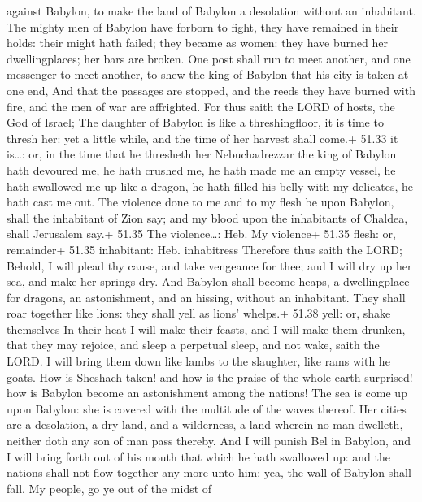 against Babylon, to make the land of Babylon a desolation without an
inhabitant.  The mighty men of Babylon have forborn to
fight, they have remained in their holds: their might hath failed; they
became as women: they have burned her dwellingplaces; her bars are
broken.  One post shall run to meet another, and one
messenger to meet another, to shew the king of Babylon that his city is
taken at one end,  And that the passages are stopped, and
the reeds they have burned with fire, and the men of war are affrighted.
 For thus saith the LORD of hosts, the God of Israel; The
daughter of Babylon is like a threshingfloor, it is time to thresh her:
yet a little while, and the time of her harvest shall come.+ 51.33 it
is\ldots: or, in the time that he thresheth her 
Nebuchadrezzar the king of Babylon hath devoured me, he hath crushed me,
he hath made me an empty vessel, he hath swallowed me up like a dragon,
he hath filled his belly with my delicates, he hath cast me out.
 The violence done to me and to my flesh be upon Babylon,
shall the inhabitant of Zion say; and my blood upon the inhabitants of
Chaldea, shall Jerusalem say.+ 51.35 The violence\ldots: Heb. My
violence+ 51.35 flesh: or, remainder+ 51.35 inhabitant: Heb. inhabitress
 Therefore thus saith the LORD; Behold, I will plead thy
cause, and take vengeance for thee; and I will dry up her sea, and make
her springs dry.  And Babylon shall become heaps, a
dwellingplace for dragons, an astonishment, and an hissing, without an
inhabitant.  They shall roar together like lions: they
shall yell as lions' whelps.+ 51.38 yell: or, shake themselves
 In their heat I will make their feasts, and I will make
them drunken, that they may rejoice, and sleep a perpetual sleep, and
not wake, saith the LORD.  I will bring them down like
lambs to the slaughter, like rams with he goats.  How is
Sheshach taken! and how is the praise of the whole earth surprised! how
is Babylon become an astonishment among the nations!  The
sea is come up upon Babylon: she is covered with the multitude of the
waves thereof.  Her cities are a desolation, a dry land,
and a wilderness, a land wherein no man dwelleth, neither doth any son
of man pass thereby.  And I will punish Bel in Babylon, and
I will bring forth out of his mouth that which he hath swallowed up: and
the nations shall not flow together any more unto him: yea, the wall of
Babylon shall fall.  My people, go ye out of the midst of
